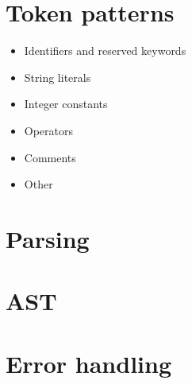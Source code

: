 \documentclass[a4paper]{article}
\begin{document}
\section{Token patterns}

\begin{itemize}
  \item Identifiers and reserved keywords
  \item String literals
  \item Integer constants
  \item Operators
  \item Comments
  \item Other
\end{itemize}

\section{Parsing}

\section{AST}

\section{Error handling}
\end{document}
